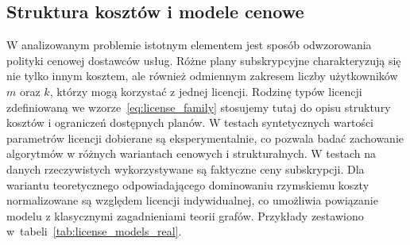 \subsection{Struktura kosztów i modele cenowe}

W analizowanym problemie istotnym elementem jest sposób odwzorowania polityki cenowej dostawców usług.
Różne plany subskrypcyjne charakteryzują się nie tylko innym kosztem, ale również odmiennym zakresem liczby użytkowników $m$ oraz $k$, którzy mogą korzystać z jednej licencji.
Rodzinę typów licencji zdefiniowaną we wzorze~\eqref{eq:license_family} stosujemy tutaj do opisu struktury kosztów i ograniczeń dostępnych planów.
W testach syntetycznych wartości parametrów licencji dobierane są eksperymentalnie, co pozwala badać zachowanie algorytmów w różnych wariantach cenowych i strukturalnych.
W testach na danych rzeczywistych wykorzystywane są faktyczne ceny subskrypcji.
Dla wariantu teoretycznego odpowiadającego dominowaniu rzymskiemu koszty normalizowane są względem licencji indywidualnej, co umożliwia powiązanie modelu z klasycznymi zagadnieniami teorii grafów.
Przykłady zestawiono w~tabeli~\ref{tab:license_models_real}.


